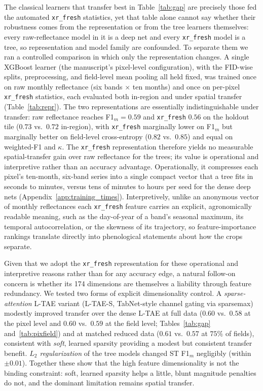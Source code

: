 \documentclass[pdflatex,sn-mathphys]{sn-jnl} %
\begin{document}
The classical learners that transfer best in Table~\ref{tab:gap} are precisely those fed
the automated \texttt{xr\_fresh} statistics, yet that table alone cannot say whether their
robustness comes from the representation or from the tree learners themselves: every
raw-reflectance model in it is a deep net and every \texttt{xr\_fresh} model is a tree, so
representation and model family are confounded. To separate them we ran a controlled
comparison in which only the representation changes. A single XGBoost learner (the
manuscript's pixel-level configuration), with the FID-wise splits, preprocessing, and
field-level mean pooling all held fixed, was trained once on raw monthly reflectance (six
bands $\times$ ten months) and once on per-pixel \texttt{xr\_fresh} statistics, each
evaluated both in-region and under spatial transfer (Table~\ref{tab:repr}). The two
representations are essentially indistinguishable under transfer: raw reflectance reaches
F1$_m=0.59$ and \texttt{xr\_fresh} $0.56$ on the holdout tile ($0.73$ vs.\ $0.72$
in-region), with \texttt{xr\_fresh} marginally lower on F1$_m$ but marginally better on
field-level cross-entropy ($0.82$ vs.\ $0.85$) and equal on weighted-F1 and $\kappa$. The
\texttt{xr\_fresh} representation therefore yields no measurable spatial-transfer gain over
raw reflectance for the trees; its value is operational and interpretive rather than an
accuracy advantage. Operationally, it compresses each pixel's ten-month, six-band series
into a single compact vector that a tree fits in seconds to minutes, versus tens of minutes
to hours per seed for the dense deep nets (Appendix~\ref{app:training_times}).
Interpretively, unlike an anonymous vector of monthly reflectances each \texttt{xr\_fresh}
feature carries an explicit, agronomically readable meaning, such as the day-of-year of a
band's seasonal maximum, its temporal autocorrelation, or the skewness of its trajectory,
so feature-importance rankings translate directly into phenological statements about how
the crops separate.

Given that we adopt the \texttt{xr\_fresh} representation for these operational and
interpretive reasons rather than for any accuracy edge, a natural follow-on concern is
whether its 174 dimensions are themselves a liability through feature redundancy. We
tested two forms of explicit dimensionality control. A
\emph{sparse-attention} L-TAE variant (L-TAE-S, TabNet-style channel gating via
sparsemax) modestly improved transfer over the dense L-TAE at full data
($0.60$ vs.\ $0.58$ at the pixel level and $0.60$ vs.\ $0.59$ at the field level;
Tables~\ref{tab:gap} and~\ref{tab:pixfield}) and at matched reduced data
($0.61$ vs.\ $0.57$ at $75\%$ of fields), consistent with \emph{soft}, learned
sparsity providing a modest but consistent transfer benefit. \emph{$L_2$ regularization} of the tree models
changed ST F1$_m$ negligibly (within $\pm0.01$). Together these show that the high
feature dimensionality is not the binding constraint: soft, learned sparsity helps a
little, blunt magnitude penalties do not, and the dominant limitation remains spatial
transfer.
\end{document}
